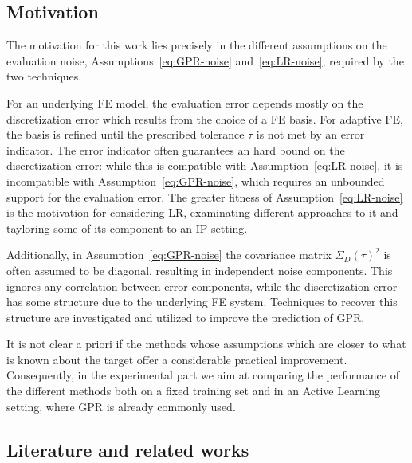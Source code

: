 \subsection{Motivation}\label{sec:motivation}

The motivation for this work lies precisely in the different assumptions on the evaluation noise, Assumptions~\ref{eq:GPR-noise} and~\ref{eq:LR-noise}, required by the two techniques.

For an underlying FE model, the evaluation error depends mostly on the discretization error which results from the choice of a FE basis.
For adaptive FE, the basis is refined until the prescribed tolerance $\tau$ is not met by an error indicator.
The error indicator often guarantees an hard bound on the discretization error: while this is compatible with Assumption~\ref{eq:LR-noise}, it is incompatible with Assumption~\ref{eq:GPR-noise}, which requires an unbounded support for the evaluation error. 
The greater fitness of Assumption~\ref{eq:LR-noise} is the motivation for considering LR, examinating different approaches to it and tayloring some of its component to an IP setting.

Additionally, in Assumption~\ref{eq:GPR-noise} the covariance matrix $\Sigma_D(\tau)^2$ is often assumed to be diagonal, resulting in independent noise components. 
This ignores any correlation between error components, while the discretization error has some structure due to the underlying FE system.
Techniques to recover this structure are investigated and utilized to improve the prediction of GPR.

It is not clear a priori if the methods whose assumptions which are closer to what is known about the target offer a considerable practical improvement.
Consequently, in the experimental part we aim at comparing the performance of the different methods both on a fixed training set and in an Active Learning setting, where GPR is already commonly used. 


\subsection{Literature and related works}\label{sec:literature}
